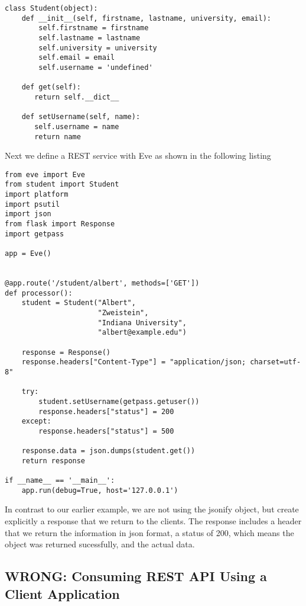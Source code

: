 \begin{lstlisting}
class Student(object):
    def __init__(self, firstname, lastname, university, email):
        self.firstname = firstname
        self.lastname = lastname
        self.university = university
        self.email = email
        self.username = 'undefined'

    def get(self): 
       return self.__dict__

    def setUsername(self, name):
       self.username = name
       return name

\end{lstlisting}

Next we define a REST service with Eve as shown in the following
listing

\begin{lstlisting}
from eve import Eve
from student import Student
import platform
import psutil
import json
from flask import Response
import getpass

app = Eve()


@app.route('/student/albert', methods=['GET'])
def processor():
    student = Student("Albert", 
                      "Zweistein", 
                      "Indiana University", 
                      "albert@example.edu")

    response = Response()
    response.headers["Content-Type"] = "application/json; charset=utf-8"

    try:
        student.setUsername(getpass.getuser())
        response.headers["status"] = 200
    except:
        response.headers["status"] = 500

    response.data = json.dumps(student.get())        
    return response

if __name__ == '__main__':
    app.run(debug=True, host='127.0.0.1')
\end{lstlisting}


In contrast to our earlier example, we are not using the jsonify
object, but create explicitly a response that we return to the
clients. The response includes a header that we return the information
in json format, a status of 200, which means the object was returned
sucessfully, and the actual data.




\subsection{WRONG: Consuming REST API Using a Client Application}


